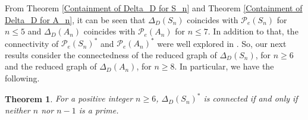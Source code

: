 \documentclass[12pt,a4paper]{article}
\newtheorem{theorem}{Theorem}[section]
\begin{document}
From Theorem \ref{Containment of Delta_D for S_n} and Theorem \ref{Containment of Delta_D for A_n}, it can be seen that $\Delta_D(S_n)$ coincides with $\mathcal{P}_e(S_n)$ for $n\leq 5$ and $\Delta_D(A_n)$ coincides with $\mathcal{P}_e(A_n)$ for $n\leq 7$. In addition to that, the connectivity of $\mathcal{P}_e(S_n)^*$ and $\mathcal{P}_e(A_n)^*$ were well explored in \cite{bera}. So, our next results consider the connectedness of the reduced graph of $\Delta_D(S_n)$, for $n\geq 6$ and the reduced graph of $\Delta_D(A_n)$, for $n\geq 8$. In particular, we have the following.

\begin{theorem}\label{Reduced_Sn_connected}
For a positive integer $n\geq 6$, $\Delta_D(S_n)^*$ is connected if and only if neither $n$ nor $n-1$ is a prime.
\end{theorem}
\end{document}
